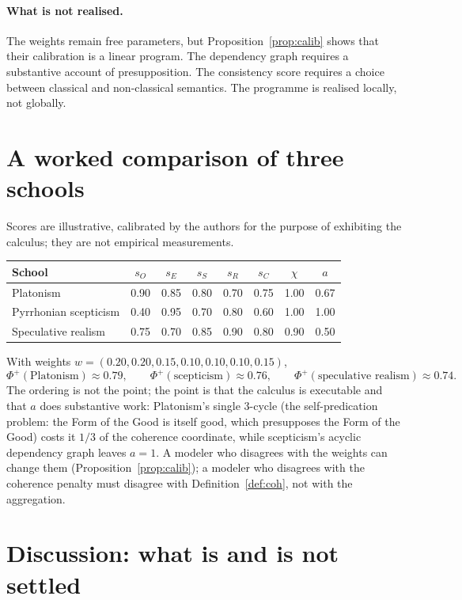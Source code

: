 \documentclass[11pt]{article}
\theoremstyle{definition}
\theoremstyle{remark}
\newcommand{\Ph}{\Phi^{+}}
\newcommand{\sO}{s_O}
\newcommand{\sE}{s_E}
\newcommand{\sS}{s_S}
\newcommand{\sR}{s_R}
\newcommand{\sC}{s_C}
\begin{document}
\paragraph{What is not realised.} The weights remain free parameters, but Proposition~\ref{prop:calib} shows that their calibration is a linear program. The dependency graph requires a substantive account of presupposition. The consistency score requires a choice between classical and non-classical semantics. The programme is realised locally, not globally.

\section{A worked comparison of three schools}\label{sec:case}

Scores are illustrative, calibrated by the authors for the purpose of exhibiting the calculus; they are not empirical measurements.

\begin{center}
\begin{tabular}{lccccccc}
\hline
School & $\sO$ & $\sE$ & $\sS$ & $\sR$ & $\sC$ & $\chi$ & $a$ \\
\hline
Platonism & 0.90 & 0.85 & 0.80 & 0.70 & 0.75 & 1.00 & 0.67 \\
Pyrrhonian scepticism & 0.40 & 0.95 & 0.70 & 0.80 & 0.60 & 1.00 & 1.00 \\
Speculative realism & 0.75 & 0.70 & 0.85 & 0.90 & 0.80 & 0.90 & 0.50 \\
\hline
\end{tabular}
\end{center}

With weights $w=(0.20,0.20,0.15,0.10,0.10,0.10,0.15)$,
\[
\Ph(\text{Platonism})\approx 0.79,\qquad
\Ph(\text{scepticism})\approx 0.76,\qquad
\Ph(\text{speculative realism})\approx 0.74.
\]
The ordering is not the point; the point is that the calculus is executable and that $a$ does substantive work: Platonism's single $3$-cycle (the self-predication problem: the Form of the Good is itself good, which presupposes the Form of the Good) costs it $1/3$ of the coherence coordinate, while scepticism's acyclic dependency graph leaves $a=1$. A modeler who disagrees with the weights can change them (Proposition~\ref{prop:calib}); a modeler who disagrees with the coherence penalty must disagree with Definition~\ref{def:coh}, not with the aggregation.

\section{Discussion: what is and is not settled}\label{sec:disc}
\end{document}

